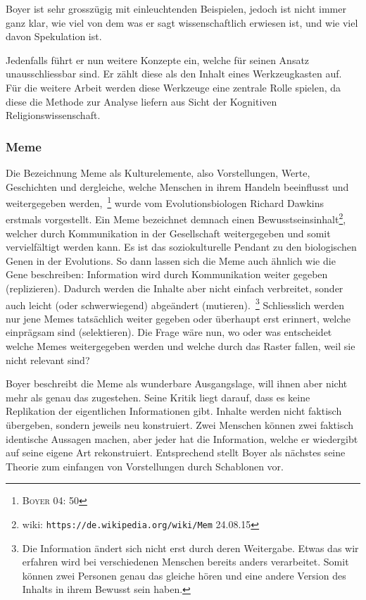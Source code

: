 Boyer ist sehr grosszügig mit einleuchtenden Beispielen, jedoch ist nicht immer ganz klar, wie viel von dem was er sagt wissenschaftlich erwiesen ist, und wie viel davon Spekulation ist. 

Jedenfalls führt er nun weitere Konzepte ein, welche für seinen Ansatz unausschliessbar sind. Er zählt diese als den Inhalt eines Werkzeugkasten auf. Für die weitere Arbeit werden diese Werkzeuge eine zentrale Rolle spielen, da diese die Methode zur Analyse liefern aus Sicht der Kognitiven Religionswissenschaft.

\subsubsection*{Meme}
Die Bezeichnung Meme als Kulturelemente, also Vorstellungen, Werte, Geschichten und dergleiche, welche Menschen in ihrem Handeln beeinflusst und weitergegeben werden,~\footnote{\textsc{Boyer} 04: 50} wurde vom Evolutionsbiologen Richard Dawkins erstmals vorgestellt. Ein Meme bezeichnet demnach einen Bewusstseinsinhalt\footnote{wiki: \texttt{https://de.wikipedia.org/wiki/Mem} 24.08.15}, welcher durch Kommunikation in der Gesellschaft weitergegeben und somit vervielfältigt werden kann. Es ist das soziokulturelle Pendant zu den biologischen Genen in der Evolutions. So dann lassen sich die Meme auch ähnlich wie die Gene beschreiben: Information wird durch Kommunikation weiter gegeben (replizieren). Dadurch werden die Inhalte aber nicht einfach verbreitet, sonder auch leicht (oder schwerwiegend) abgeändert (mutieren).~\footnote{Die Information ändert sich nicht erst durch deren Weitergabe. Etwas das wir erfahren wird bei verschiedenen Menschen bereits anders verarbeitet. Somit können zwei Personen genau das gleiche hören und eine andere Version des Inhalts in ihrem Bewusst sein haben.} Schliesslich werden nur jene Memes tatsächlich weiter gegeben oder überhaupt erst erinnert, welche einprägsam sind (selektieren). Die Frage wäre nun, wo oder was entscheidet welche Memes weitergegeben werden und welche durch das Raster fallen, weil sie nicht relevant sind? 

Boyer beschreibt die Meme als wunderbare Ausgangslage, will ihnen aber nicht mehr als genau das zugestehen. Seine Kritik liegt darauf, dass es keine Replikation der eigentlichen Informationen gibt. Inhalte werden nicht faktisch übergeben, sondern jeweils neu konstruiert. Zwei Menschen können zwei faktisch identische Aussagen machen, aber jeder hat die Information, welche er wiedergibt auf seine eigene Art rekonstruiert. Entsprechend stellt Boyer als nächstes seine Theorie zum einfangen von Vorstellungen durch Schablonen vor. 

